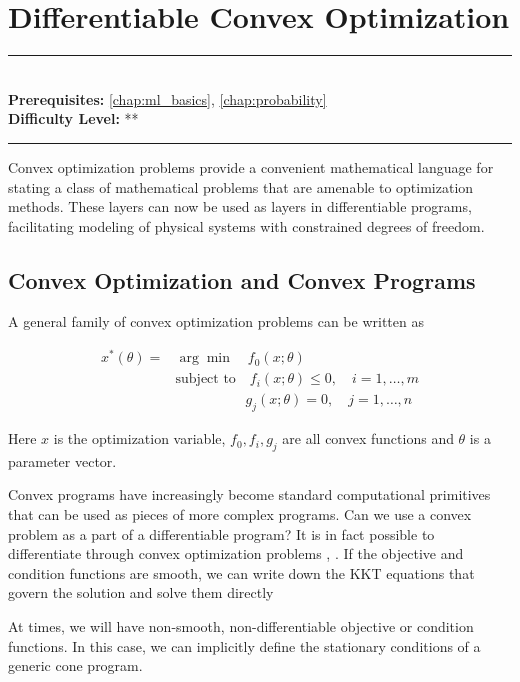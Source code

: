 \documentclass[book.tex]{subfiles}
\begin{document}
\chapter{Differentiable Convex Optimization}
\label{chap:deep_equilibrium}
\noindent\rule{11cm}{0.4pt} \\
\textbf{Prerequisites:}  \autoref{chap:ml_basics}, \autoref{chap:probability}  \\
\textbf{Difficulty Level:} ** \\
\noindent\rule{11cm}{0.4pt}
\vspace{5mm}

Convex optimization problems provide a convenient mathematical language for stating a class of mathematical problems that are amenable to optimization methods. These layers can now be used as layers in differentiable programs, facilitating modeling of physical systems with constrained degrees of freedom.

\section{Convex Optimization and Convex Programs}
A general family of convex optimization problems can be written as

\begin{align}
    x^*(\theta) = &\arg\min \quad f_0(x; \theta) \\
    &\textrm{subject to} \quad f_i(x; \theta) \leq 0,\quad i = 1,\dotsc,m \\
    &\qquad \qquad \quad  g_j(x;\theta) = 0, \quad j=1,\dotsc, n
\end{align}

Here $x$ is the optimization variable, $f_0, f_i, g_j$ are all convex functions and $\theta$ is a parameter vector.

Convex programs have increasingly become standard computational primitives that can be used as pieces of more complex programs. Can we use a convex problem as a part of a differentiable program? It is in fact possible to differentiate through convex optimization problems \cite{agrawal2019differentiable}, \cite{agrawal2020learning}. If the objective and condition functions are smooth, we can write down the KKT equations that govern the solution and solve them directly 

At times, we will have non-smooth, non-differentiable objective or condition functions. In this case, we can implicitly define the stationary conditions of a generic cone program.
\end{document}
